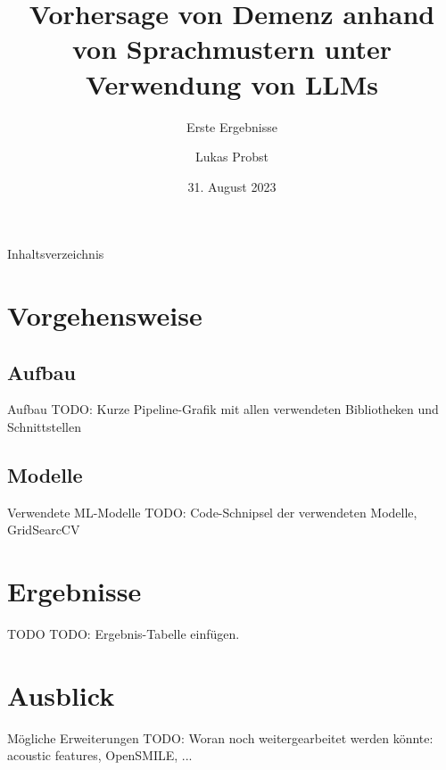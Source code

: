\documentclass{sdqbeamer}
\title[Demenz-Prognose mit LLMs]{Vorhersage von Demenz anhand von Sprachmustern unter Verwendung von LLMs}
\subtitle{Erste Ergebnisse}
\author[Lukas Probst]{Lukas Probst}
\date[31.\,8.\,2023]{31. August 2023}
\begin{document}
 
\KITtitleframe

\begin{frame}{Inhaltsverzeichnis}
\tableofcontents
\end{frame}

\section{Vorgehensweise}

\subsection{Aufbau}
\begin{frame}{Aufbau}
	TODO: Kurze Pipeline-Grafik mit allen verwendeten Bibliotheken und 
	Schnittstellen
\end{frame}

\subsection{Modelle}
\begin{frame}{Verwendete ML-Modelle}
	TODO: Code-Schnipsel der verwendeten Modelle, GridSearcCV
\end{frame}


\section{Ergebnisse}
\begin{frame}{TODO}
	TODO: Ergebnis-Tabelle einfügen.
\end{frame}
	
\section{Ausblick}
\begin{frame}{Mögliche Erweiterungen}
	TODO: Woran noch weitergearbeitet werden könnte: acoustic features, OpenSMILE, ...
\end{frame}
\end{document}
